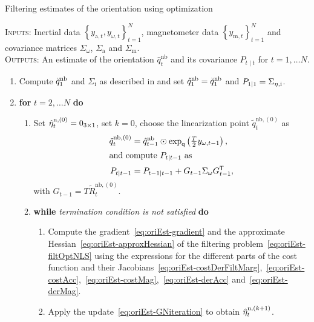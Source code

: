 \begin{algorithm}[ht]
\caption{\textsf{Filtering estimates of the orientation using optimization}}
\label{alg:oriEst-filteringOpt}
\small
\textsc{Inputs:} Inertial data $\left\{ y_{\text{a},t}, y_{\omega,t} \right\}_{t=1}^N$, magnetometer data $\left\{ y_{\text{m},t}\right\}_{t=1}^N$ and covariance matrices $\Sigma_\omega$, $\Sigma_\text{a}$ and $\Sigma_\text{m}$. \\
\textsc{Outputs:} An estimate of the orientation $\hat{q}^\text{nb}_{t}$ and its covariance $P_{t \mid t}$ for $t = 1, \hdots N$.
\algrule[.4pt]
\begin{enumerate}
\item Compute $\breve{q}_1^\text{nb}$ and $\Sigma_\text{i}$ as described in  and set $\hat{q}_{1}^\text{nb} = \breve{q}_{1}^\text{nb}$ and $P_{1 \mid 1} = \Sigma_{\eta,\text{i}}$.
\item \textbf{for} $t = 2, \hdots N$ \textbf{do}
\begin{enumerate}
\item Set $\hat {\eta}_t^{\text{n},(0)} = 0_{3 \times 1}$, set $k = 0$, choose the linearization point $\tilde q^{\text{nb},(0)}_t$ as
\begin{subequations}
\begin{align}
\label{eq:oriEst-filteringOpt-updateLinPointIt0}
\tilde q^{\text{nb},(0)}_t &= \hat{q}^{\text{nb}}_{t-1} \odot \exp_\mathsf{q} \left( \tfrac{T}{2} y_{\omega,t-1} \right), \\
\intertext{and compute $P_{t \mid t-1}$ as}
P_{t \mid t-1} &= P_{t-1 \mid t-1} + G_{t-1} \Sigma_\omega G_{t-1}^{\mathsf{T}},
\label{eq:oriEst-timeUpdateFiltOpt}
\end{align}
\end{subequations}
with $G_{t-1} = T \tilde{R}^{\text{nb},(0)}_{t}$.
\item \textbf{while} \textit{termination condition is not satisfied} \textbf{do}
\begin{enumerate}
\item Compute the gradient~\eqref{eq:oriEst-gradient} and the approximate Hessian~\eqref{eq:oriEst-approxHessian} of the filtering problem~\eqref{eq:oriEst-filtOptNLS} using the expressions for the different parts of the cost function and their Jacobians~\eqref{eq:oriEst-costDerFiltMarg},~\eqref{eq:oriEst-costAcc},~\eqref{eq:oriEst-costMag},~\eqref{eq:oriEst-derAcc} and~\eqref{eq:oriEst-derMag}.
\item Apply the update~\eqref{eq:oriEst-GNiteration} to obtain $\hat {\eta}_{t}^{\text{n},(k+1)}$.

\end{enumerate}
\end{enumerate}
\end{enumerate}
\end{algorithm}
